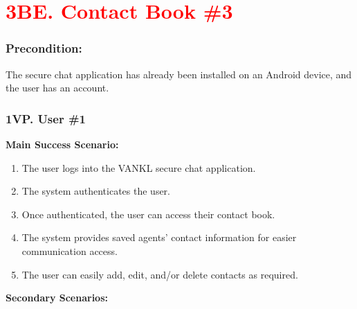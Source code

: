 \documentclass[]{article}
\begin{document}
\section*{\textcolor{red}{3BE. Contact Book \#3}}
\subsubsection*{Precondition:} The secure chat application has already been installed on an Android device, and the user has an account.
\subsubsection*{1VP. User \#1}
\textbf{Main Success Scenario:}
\begin{enumerate}
	\item The user logs into the VANKL secure chat application.
	\item The system authenticates the user.
	\item Once authenticated, the user can access their contact book.
	\item The system provides saved agents’ contact information for easier communication access.
	\item The user can easily add, edit, and/or delete contacts as required.
\end{enumerate}
\textbf{Secondary Scenarios:}
\end{document}
